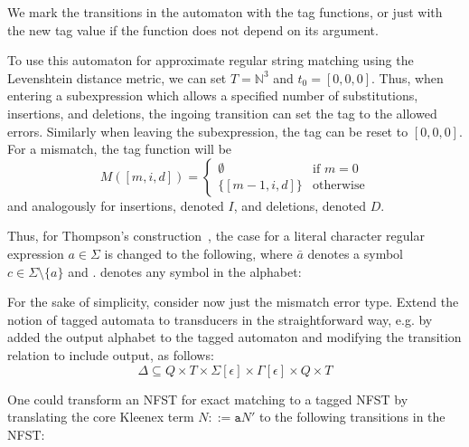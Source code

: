 We mark the transitions in the automaton with the tag functions, or just with
the new tag value if the function does not depend on its argument.

To use this automaton for approximate regular string matching using the
Levenshtein distance metric, we can set $T = \mathbb{N}^3$ and $t_0 =
[0,0,0]$. Thus, when entering a subexpression which allows a specified number
of substitutions, insertions, and deletions, the ingoing transition can set the
tag to the allowed errors. Similarly when leaving the subexpression, the tag
can be reset to $[0,0,0]$. For a mismatch, the tag function will be
\[
  M([m,i,d]) =
  \begin{cases}
    \emptyset     & \text{if } m = 0 \\
    \{[m-1,i,d]\} & \text{otherwise}
  \end{cases}
\]
and analogously for insertions, denoted $I$, and deletions, denoted $D$.

Thus, for Thompson's construction~\cite{thompson1968programming}, the case for
a literal character regular expression $a \in \Sigma$ is changed to the
following, where $\bar{a}$ denotes a symbol $c \in \Sigma \setminus \{a\}$ and
$.$ denotes any symbol in the alphabet:

\begin{center}
\end{center}

For the sake of simplicity, consider now just the mismatch error type. Extend
the notion of tagged automata to transducers in the straightforward way,
e.g. by added the output alphabet to the tagged automaton and modifying the
transition relation to include output, as follows:
\[
  \Delta \subseteq Q \times T \times \Sigma[\epsilon] \times \Gamma[\epsilon]
  \times Q \times T
\]

One could transform an NFST for exact matching to a tagged NFST by translating
the core Kleenex term $N ::= \mathtt{a}N'$ to the following transitions in the
NFST:

